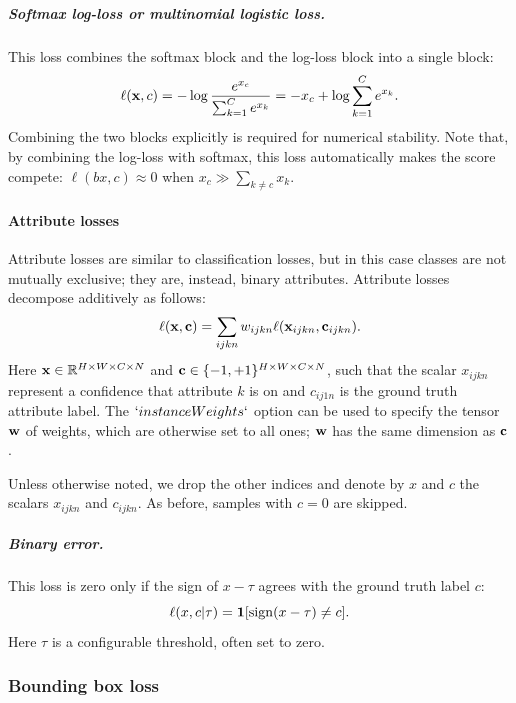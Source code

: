 \subparagraph{Softmax log-loss or multinomial logistic loss.} This loss combines the softmax block and the log-loss block into a single block:
\begin{equation}\label{e:loss-softmaxlog}
\ell(\mathbf{x}, c) = - \log \frac{e^{x_c}}{\sum_{k=1}^C e^{x_k}}
= - x_c + \log \sum_{k=1}^C e^{x_k}.
\end{equation}
Combining the two blocks explicitly is required for numerical stability. Note that, by combining the log-loss with softmax, this loss automatically makes the score compete: $\ell(bx,c) \approx 0$ when $x_c \gg \sum_{k\not= c} x_k$.

\paragraph{Attribute losses}\label{s:loss-attributes}

Attribute losses are similar to classification losses, but in this case classes are not mutually exclusive; they are, instead, binary attributes. Attribute losses decompose additively as follows:
\begin{equation}\label{e:addlossattribute}
\ell(\mathbf{x},\mathbf{c}) = \sum_{ijkn} w_{ijkn} \ell(\mathbf{x}_{ijkn}, \mathbf{c}_{ijkn}).
\end{equation}
Here $\mathbf{x}\in \mathbb{R}^{H \times W \times C \times N}$ and $\mathbf{c} \in \{-1,+1\}^{H \times W \times C \times N}$, such that the scalar $x_{ijkn}$ represent a confidence that attribute $k$ is on and $c_{ij1n}$ is the ground truth attribute label. The $`instanceWeights`$ option can be used to specify the tensor $\mathbf{w}$ of weights, which are otherwise set to all ones; $\mathbf{w}$ has the same dimension as $\mathbf{c}$.

Unless otherwise noted, we drop the other indices and denote by $x$ and $c$  the scalars $x_{ijkn}$ and  $c_{ijkn}$. As before, samples with $c=0$ are skipped.

\subparagraph{Binary error.} This loss is zero only if the sign of $x - \tau$ agrees with the ground truth label $c$:
\begin{equation}\label{e:loss-binary}
\ell(x,c|\tau) = \mathbf{1}[\sign(x-\tau) \not= c].
\end{equation}
Here $\tau$ is a configurable threshold, often set to zero.


\subsubsection{Bounding box loss}\label{s:loss-bb}

